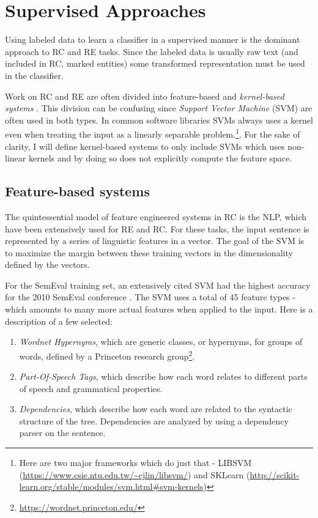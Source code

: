 
\section{Supervised Approaches}

Using labeled data to learn a classifier in a supervised manner is the dominant approach to RC and RE tasks. Since the labeled data is usually raw text (and included in RC, marked entities) some transformed representation must be used in the classifier.    

Work on RC and RE are often divided into feature-based and \emph{kernel-based systems} \cite{re_cnn} \cite{zeng2014}. This division can be confusing since \emph{Support Vector Machine} (SVM) are often used in both types. In common software libraries SVMs always uses a kernel even when treating the input as a linearly separable problem.\footnote{Here are two major frameworks which do just that - LIBSVM (\url{https://www.csie.ntu.edu.tw/~cjlin/libsvm/}) and SKLearn (\url{http://scikit-learn.org/stable/modules/svm.html\#svm-kernels})}. For the sake of clarity, I will define kernel-based systems to only include SVMs which uses non-linear kernels and by doing so does not explicitly compute the feature space.

\subsection{Feature-based systems}

The quintessential model of feature engineered systems in RC is the NLP, %
which have been extensively used for RE and RC. For these tasks, the input sentence is represented by a series 
of linguistic features in a vector. The goal of the SVM is to maximize the margin between these training vectors in the dimensionality defined by the vectors. 

For the SemEval training set, an extensively cited SVM had the highest accuracy for the 2010 SemEval conference \cite{semevalSVM}. The SVM uses a total of 45 feature types - which amounts to many more actual features when applied to the input. Here is a description of a few selected:

\begin{enumerate}

\item \emph{Wordnet Hypernyms}, which are generic classes, or hypernyms, for groups of words, defined by a Princeton research group\footnote{\url{https://wordnet.princeton.edu/}}.

\item \emph{Part-Of-Speech Tags}, which describe how each word relates to different parts of speech and grammatical properties.

\item \emph{Dependencies}, which describe how each word are related to the syntactic structure of the tree. Dependencies are analyzed by using a dependency parser on the sentence.
\end{enumerate} 


